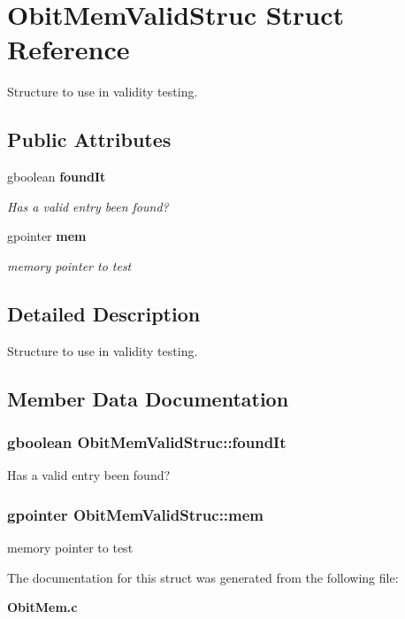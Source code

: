 \section{Obit\-Mem\-Valid\-Struc Struct Reference}
\label{structObitMemValidStruc}
Structure to use in validity testing.  


\subsection*{Public Attributes}
\begin{CompactItemize}
\item 
gboolean {\bf found\-It}
\begin{CompactList}\small\item\em Has a valid entry been found? \item\end{CompactList}\item 
gpointer {\bf mem}
\begin{CompactList}\small\item\em memory pointer to test \item\end{CompactList}\end{CompactItemize}


\subsection{Detailed Description}
Structure to use in validity testing. 



\subsection{Member Data Documentation}
\subsubsection{\setlength{\rightskip}{0pt plus 5cm}gboolean {\bf Obit\-Mem\-Valid\-Struc::found\-It}}\label{structObitMemValidStruc_o0}


Has a valid entry been found? 

\subsubsection{\setlength{\rightskip}{0pt plus 5cm}gpointer {\bf Obit\-Mem\-Valid\-Struc::mem}}\label{structObitMemValidStruc_o1}


memory pointer to test 



The documentation for this struct was generated from the following file:\begin{CompactItemize}
\item 
{\bf Obit\-Mem.c}\end{CompactItemize}
